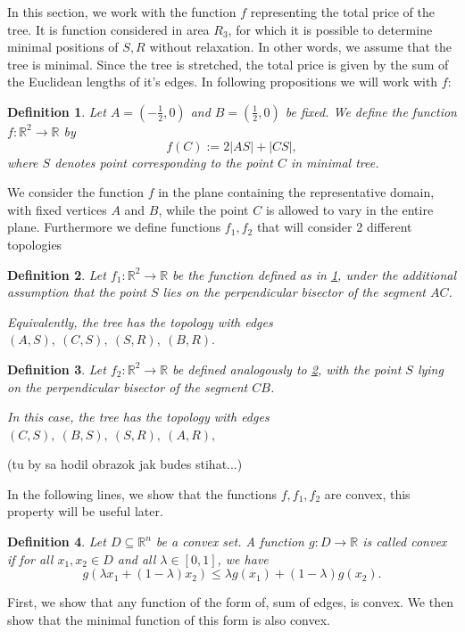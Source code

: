 \documentclass[openany]{book}
\newtheorem{definition}{Definition}
\begin{document}
	In this section, we work with the function \(f\) representing the total price of the tree. It is function considered in area \(R_3\), for which it is
	possible to determine minimal positions of \(S,R\) without relaxation. In other words, we assume that the tree is minimal. Since the tree is stretched, the total price is given by the sum of the Euclidean lengths of it's edges.
	In following propositions we will work with \(f\):
	\begin{definition}\label{def:f}
		Let \(A = \left(-\tfrac12,0\right)\) and \(B = \left(\tfrac12,0\right)\) be fixed.
		We define the function \(f : \mathbb{R}^2 \to \mathbb{R}\) by
		\[
		f(C) := 2|AS| + |CS|,
		\]
		where \(S\) denotes point corresponding to the point \(C\) in minimal tree.
	\end{definition}
	We consider the function \(f\) in the plane containing the representative
	domain, with fixed vertices \(A\) and \(B\), while the point \(C\) is allowed
	to vary in the entire plane.
	Furthermore we define functions \(f_1, f_2\) that will consider 2 different topologies
	\begin{definition}\label{def:f1}
		Let \(f_1 : \mathbb{R}^2 \to \mathbb{R}\) be the function defined as in
		\cref{def:f}, under the additional assumption that the point \(S\)
		lies on the perpendicular bisector of the segment \(AC\).
		
		Equivalently, the tree has the topology with edges \((A,S),\ (C,S),\ (S,R),\ (B,R).\)
	\end{definition}
	\begin{definition}\label{def:f2}
		Let \(f_2 : \mathbb{R}^2 \to \mathbb{R}\) be defined analogously to
		\cref{def:f1}, with the  point \(S\) lying on the perpendicular
		bisector of the segment \(CB\).
		
		In this case, the tree has the topology with edges \( (C,S),\ (B,S),\ (S,R),\ (A,R), \)
	\end{definition}
	
	(tu by sa hodil obrazok jak budes stihat...)
	
	In the following lines, we show that the functions \(f, f_1, f_2\) are convex, this property will be useful later. 
	\begin{definition}\label{def:convex_function}
		Let \(D \subseteq \mathbb{R}^n\) be a convex set. A function
		\(g : D \to \mathbb{R}\) is called convex if for all \(x_1,x_2 \in D\)
		and all \(\lambda \in [0,1]\), we have
		\[
		g(\lambda x_1 + (1-\lambda)x_2)
		\leq
		\lambda g(x_1) + (1-\lambda)g(x_2).
		\]
	\end{definition}
	First, we show that any function of the form of, sum of edges, is convex. We then show that the minimal function of this form is also convex.
	
\end{document}
